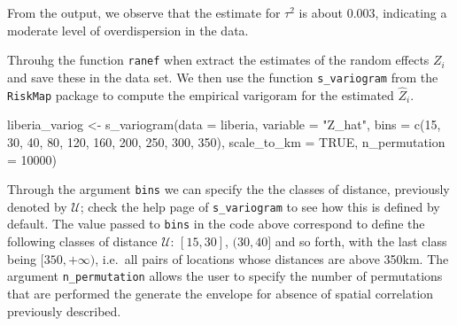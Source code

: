 \documentclass[
  letterpaper,
]{krantz}
\newenvironment{Shaded}{\begin{snugshade}}{\end{snugshade}}
\newcommand{\AttributeTok}[1]{\textcolor[rgb]{0.40,0.45,0.13}{#1}}
\newcommand{\ConstantTok}[1]{\textcolor[rgb]{0.56,0.35,0.01}{#1}}
\newcommand{\DecValTok}[1]{\textcolor[rgb]{0.68,0.00,0.00}{#1}}
\newcommand{\FunctionTok}[1]{\textcolor[rgb]{0.28,0.35,0.67}{#1}}
\newcommand{\NormalTok}[1]{\textcolor[rgb]{0.00,0.23,0.31}{#1}}
\newcommand{\OtherTok}[1]{\textcolor[rgb]{0.00,0.23,0.31}{#1}}
\newcommand{\SpecialCharTok}[1]{\textcolor[rgb]{0.37,0.37,0.37}{#1}}
\newcommand{\StringTok}[1]{\textcolor[rgb]{0.13,0.47,0.30}{#1}}
\begin{document}
From the output, we observe that the estimate for \(\tau^2\) is about
0.003, indicating a moderate level of overdispersion in the data.

\begin{Shaded}
\end{Shaded}

Throuhg the function \texttt{ranef} when extract the estimates of the
random effects \(Z_i\) and save these in the data set. We then use the
function \texttt{s\_variogram} from the \texttt{RiskMap} package to
compute the empirical varigoram for the estimated \(\hat{Z}_i\).

\begin{Shaded}
\begin{Highlighting}[]
\NormalTok{liberia\_variog }\OtherTok{\textless{}{-}} \FunctionTok{s\_variogram}\NormalTok{(}\AttributeTok{data =}\NormalTok{ liberia,}
                              \AttributeTok{variable =} \StringTok{"Z\_hat"}\NormalTok{,}
                              \AttributeTok{bins =} \FunctionTok{c}\NormalTok{(}\DecValTok{15}\NormalTok{, }\DecValTok{30}\NormalTok{, }\DecValTok{40}\NormalTok{, }\DecValTok{80}\NormalTok{, }\DecValTok{120}\NormalTok{,}
                                       \DecValTok{160}\NormalTok{, }\DecValTok{200}\NormalTok{, }\DecValTok{250}\NormalTok{, }\DecValTok{300}\NormalTok{, }\DecValTok{350}\NormalTok{),}
                              \AttributeTok{scale\_to\_km =} \ConstantTok{TRUE}\NormalTok{,}
                              \AttributeTok{n\_permutation =} \DecValTok{10000}\NormalTok{)}
\end{Highlighting}
\end{Shaded}

Through the argument \texttt{bins} we can specify the the classes of
distance, previously denoted by \(\mathcal{U}\); check the help page of
\texttt{s\_variogram} to see how this is defined by default. The value
passed to \texttt{bins} in the code above correspond to define the
following classes of distance \(\mathcal{U}\): \([15, 30]\),
\((30, 40]\) and so forth, with the last class being \([350, +\infty)\),
i.e.~all pairs of locations whose distances are above 350km. The
argument \texttt{n\_permutation} allows the user to specify the number
of permutations that are performed the generate the envelope for absence
of spatial correlation previously described.
\end{document}
